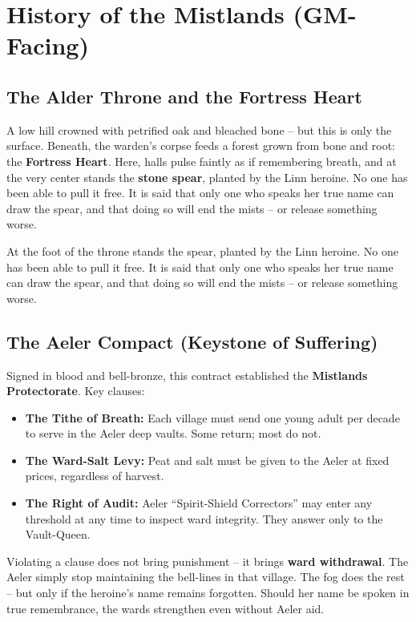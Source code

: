 \documentclass[12pt]{article}
\begin{document}
\section{History of the Mistlands (GM-Facing)}

\subsection{The Alder Throne and the Fortress Heart}
A low hill crowned with petrified oak and bleached bone -- but this is only the surface. Beneath, the warden's corpse feeds a forest grown from bone and root: the \textbf{Fortress Heart}. Here, halls pulse faintly as if remembering breath, and at the very center stands the \textbf{stone spear}, planted by the Linn heroine. No one has been able to pull it free. It is said that only one who speaks her true name can draw the spear, and that doing so will end the mists -- or release something worse.

At the foot of the throne stands the spear, planted by the Linn heroine. No one has been able to pull it free. It is said that only one who speaks her true name can draw the spear, and that doing so will end the mists -- or release something worse.

\subsection{The Aeler Compact (Keystone of Suffering)}
Signed in blood and bell-bronze, this contract established the \textbf{Mistlands Protectorate}. Key clauses:
\begin{itemize}[leftmargin=*]
  \item \textbf{The Tithe of Breath:} Each village must send one young adult per decade to serve in the Aeler deep vaults. Some return; most do not.
  \item \textbf{The Ward-Salt Levy:} Peat and salt must be given to the Aeler at fixed prices, regardless of harvest.
  \item \textbf{The Right of Audit:} Aeler ``Spirit-Shield Correctors'' may enter any threshold at any time to inspect ward integrity. They answer only to the Vault-Queen.
\end{itemize}

Violating a clause does not bring punishment -- it brings \textbf{ward withdrawal}. The Aeler simply stop maintaining the bell-lines in that village. The fog does the rest -- but only if the heroine's name remains forgotten. Should her name be spoken in true remembrance, the wards strengthen even without Aeler aid.
\end{document}
